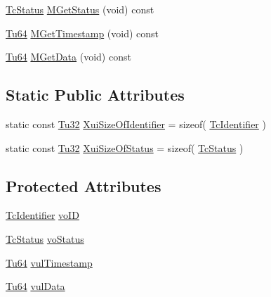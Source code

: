 \begin{DoxyCompactItemize}
\mbox{\hyperlink{class_g_n_common_1_1_n_notification_1_1_tc_status}{Tc\+Status}} \mbox{\hyperlink{class_g_n_common_1_1_n_notification_1_1_tc_alert_af6c3e9f29e796c2140dbe52229d439ca}{M\+Get\+Status}} (void) const
\item 
\mbox{\hyperlink{namespace_g_n_common_a9404ee6090c788ae70aebd1436ceb97d}{Tu64}} \mbox{\hyperlink{class_g_n_common_1_1_n_notification_1_1_tc_alert_a99c02af9bf2a17a34810ac5ed6be8856}{M\+Get\+Timestamp}} (void) const
\item 
\mbox{\hyperlink{namespace_g_n_common_a9404ee6090c788ae70aebd1436ceb97d}{Tu64}} \mbox{\hyperlink{class_g_n_common_1_1_n_notification_1_1_tc_alert_a4eeace6aa167a1b9b9a98487eee0ddb2}{M\+Get\+Data}} (void) const
\end{DoxyCompactItemize}
\subsection*{Static Public Attributes}
\begin{DoxyCompactItemize}
\item 
static const \mbox{\hyperlink{namespace_g_n_common_a941b527ef318f318aed7903dc832b7e4}{Tu32}} \mbox{\hyperlink{class_g_n_common_1_1_n_notification_1_1_tc_alert_a44f63050a2f1c7a4876a31ce2ffd2d06}{Xui\+Size\+Of\+Identifier}} = sizeof( \mbox{\hyperlink{class_g_n_common_1_1_n_notification_1_1_tc_identifier}{Tc\+Identifier}} )
\item 
static const \mbox{\hyperlink{namespace_g_n_common_a941b527ef318f318aed7903dc832b7e4}{Tu32}} \mbox{\hyperlink{class_g_n_common_1_1_n_notification_1_1_tc_alert_a59f856e0a33731ee0c235271bb013a34}{Xui\+Size\+Of\+Status}} = sizeof( \mbox{\hyperlink{class_g_n_common_1_1_n_notification_1_1_tc_status}{Tc\+Status}} )
\end{DoxyCompactItemize}
\subsection*{Protected Attributes}
\begin{DoxyCompactItemize}
\item 
\mbox{\hyperlink{class_g_n_common_1_1_n_notification_1_1_tc_identifier}{Tc\+Identifier}} \mbox{\hyperlink{class_g_n_common_1_1_n_notification_1_1_tc_alert_aa42573703fd6fa2ba90aa010fdc659ca}{vo\+ID}}
\item 
\mbox{\hyperlink{class_g_n_common_1_1_n_notification_1_1_tc_status}{Tc\+Status}} \mbox{\hyperlink{class_g_n_common_1_1_n_notification_1_1_tc_alert_ae993e1ea34de5347b08b21c9264cdb8e}{vo\+Status}}
\item 
\mbox{\hyperlink{namespace_g_n_common_a9404ee6090c788ae70aebd1436ceb97d}{Tu64}} \mbox{\hyperlink{class_g_n_common_1_1_n_notification_1_1_tc_alert_a3c6f656e3e526b9f97942188d7bb2930}{vul\+Timestamp}}
\item 
\mbox{\hyperlink{namespace_g_n_common_a9404ee6090c788ae70aebd1436ceb97d}{Tu64}} \mbox{\hyperlink{class_g_n_common_1_1_n_notification_1_1_tc_alert_ab49cb616a0e61e74234264d775a3408a}{vul\+Data}}
\end{DoxyCompactItemize}
